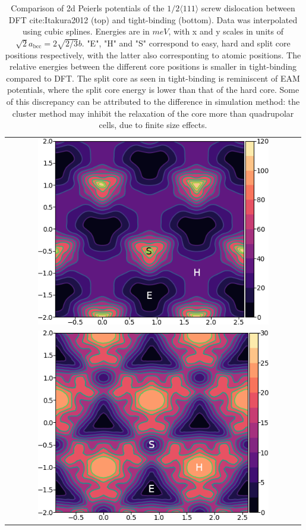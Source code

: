 \documentclass[a4paper]{article}
\begin{document}
        \begin{table}
    \begin{tabular}{c}
	     \includegraphics[width=0.8\textwidth]{../Images/itakura_dislocation_energy_landscape_2_labelled.png} \\
             \includegraphics[width=0.8\textwidth]{../Images/tbe_dislocation_energy_landscape_pure_labelled.png}  \\
    \end{tabular}		
\caption{Comparison of 2d Peierls potentials of the $1/2\langle 111\rangle$ screw dislocation between DFT cite:Itakura2012 (top) and tight-binding (bottom). Data was interpolated using cubic splines. Energies are in $meV$, with x and y scales in units of $\sqrt{2} a_{\text{bcc}} = 2\sqrt{2/3}b$. "E", "H" and "S" correspond to easy, hard and split core positions respectively, with the latter also corresponting to atomic positions. The relative energies between the different core positions is smaller in tight-binding compared to DFT. The split core as seen in tight-binding is reminiscent of EAM potentials, where the split core energy is lower than that of the hard core. Some of this discrepancy can be attributed to the difference in simulation method: the cluster method may inhibit the relaxation of the core more than quadrupolar cells, due to finite size effects.}
	\label{fig:peierlspot}
    \end{table}
\end{document}
